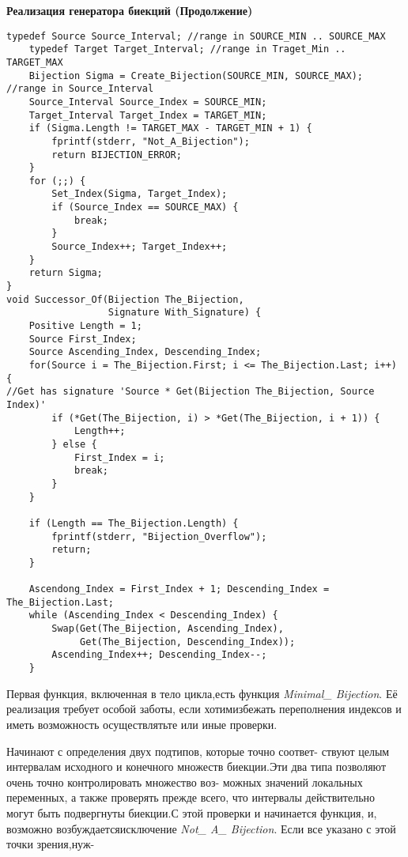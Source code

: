 
\newpage
\begin{center}
\small\textbf{Реализация генератора биекций (Продолжение)}
\end{center}
\dotfill

\begin{lstlisting}[mathescape=true]
    typedef Source Source_Interval; //range in SOURCE_MIN .. SOURCE_MAX
    typedef Target Target_Interval; //range in Traget_Min .. TARGET_MAX
    Bijection Sigma = Create_Bijection(SOURCE_MIN, SOURCE_MAX); //range in Source_Interval
    Source_Interval Source_Index = SOURCE_MIN;
    Target_Interval Target_Index = TARGET_MIN;
    if (Sigma.Length != TARGET_MAX - TARGET_MIN + 1) {
        fprintf(stderr, "Not_A_Bijection");
        return BIJECTION_ERROR;
    }
    for (;;) {
        Set_Index(Sigma, Target_Index);
        if (Source_Index == SOURCE_MAX) {
            break;
        }
        Source_Index++; Target_Index++;
    }
    return Sigma;
}
void Successor_Of(Bijection The_Bijection, 
                  Signature With_Signature) {
    Positive Length = 1;
    Source First_Index;
    Source Ascending_Index, Descending_Index;
    for(Source i = The_Bijection.First; i <= The_Bijection.Last; i++) {
//Get has signature 'Source * Get(Bijection The_Bijection, Source Index)'
        if (*Get(The_Bijection, i) > *Get(The_Bijection, i + 1)) {
            Length++;
        } else {
            First_Index = i;
            break;
        }
    }
    
    if (Length == The_Bijection.Length) {
        fprintf(stderr, "Bijection_Overflow");
        return;
    }
    
    Ascendong_Index = First_Index + 1; Descending_Index = The_Bijection.Last;
    while (Ascending_Index < Descending_Index) {
        Swap(Get(The_Bijection, Ascending_Index), 
             Get(The_Bijection, Descending_Index));
        Ascending_Index++; Descending_Index--;
    }   
\end{lstlisting}

Первая функция, включенная в тело цикла,есть функция
\textit{Minimal\_ Bijection}. Её реализация требует особой заботы, если хотим\linebreak избежать переполнения индексов и иметь возможность осуществлять\linebreak те или иные проверки.

Начинают с определения двух подтипов, которые точно соответ- \linebreak ствуют целым интервалам исходного и конечного множеств биекции.\linebreak Эти два типа позволяют очень точно контролировать множество воз- \linebreak можных значений локальных переменных, а также проверять прежде \linebreak всего, что интервалы действительно могут быть подвергнуты биекции.\linebreak С этой проверки и начинается функция, и, возможно возбуждается\linebreak исключение \textit{Not\_ A\_ Bijection}. Если все указано с этой точки зрения,нуж-

